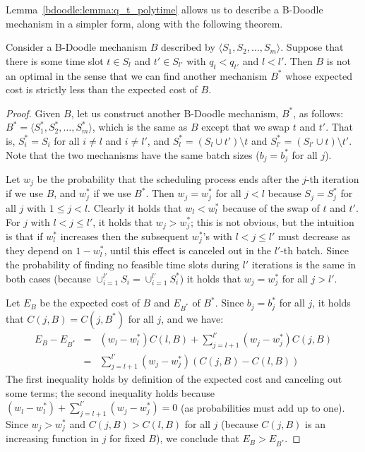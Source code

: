 Lemma~\ref{bdoodle:lemma:q_t_polytime} allows us to describe a B-Doodle mechanism in a simpler form, along with the following theorem. 
\begin{theorem} \label{bdoodle:thm:swap_argument}
Consider a B-Doodle mechanism $B$ described by $\langle S_1, S_2, \dots, S_m \rangle$. Suppose that there is some time slot $t \in S_l$ and $t'\in S_{l'}$ with $q_t < q_{t'}$ and $l < l'$. Then $B$ is not an optimal in the sense that we can find another mechanism $B^*$ whose expected cost is strictly less than the expected cost of $B$.
\end{theorem}
\begin{proof}
Given $B$, let us construct another B-Doodle mechanism, $B^*$, as follows: $B^* = \langle S^*_1, S^*_2, \dots, S^*_m \rangle$, which is the same as $B$ except that we swap $t$ and $t'$. That is, $S^*_i = S_i$ for all $i \neq l$ and $i\neq l'$, and $S^*_{l} = (S_l \cup t') \setminus t$ and $S^*_{l'} = (S_{l'} \cup t) \setminus t'$. Note that the two mechanisms have the same batch sizes ($b_j = b^*_j$ for all $j$). 

Let $w_j$ be the probability that the scheduling process ends after the $j$-th iteration if we use $B$, and $w_j^*$ if we use $B^*$. Then $w_j = w_j^*$ for all $j < l$ because $S_j = S^*_j$ for all $j$ with $1 \leq j < l$. Clearly it holds that $w_l < w_l^*$ because of the swap of $t$ and $t'$. For $j$ with $l < j \leq l'$, it holds that $w_j > w_j^*$; this is not obvious, but the intuition is that if $w_l^*$ increases then the subsequent $w_j^*$'s with $l < j \leq l'$ must decrease as they depend on $1-w_l^*$, until this effect is canceled out in the $l'$-th batch. Since the probability of finding no feasible time slots during $l'$ iterations is the same in both cases (because $\cup_{i=1}^{l'} S_i = \cup_{i=1}^{l'}S^*_i$) it holds that $w_j = w_j^*$ for all $j > l'$. 

Let $E_B$ be the expected cost of $B$ and $E_{B^*}$ of $B^*$. Since $b_j = b^*_j$ for all $j$, it holds that $C(j, B) = C(j, B^*)$ for all $j$, and we have:
\begin{eqnarray*}
	E_B - E_{B^*} 
	&=& (w_l - w_l^*)C(l, B) + \sum_{j=l+1}^{l'} (w_j - w_j^*)C(j, B) \\
	&=& \sum_{j=l+1}^{l'} (w_j - w_j^*)(C(j, B) - C(l, B))
\end{eqnarray*} 
The first inequality holds by definition of the expected cost and canceling out some terms; the second inequality holds because $(w_l - w_l^*) + \sum_{j=l+1}^{l'} (w_j - w_j^*) = 0$ (as probabilities must add up to one). Since $w_j > w_j^*$ and $C(j, B) > C(l, B)$ for all $j$ (because $C(j, B)$ is an increasing function in $j$ for fixed $B$), we conclude that $E_{B} > E_{B^*}$.
\end{proof}
